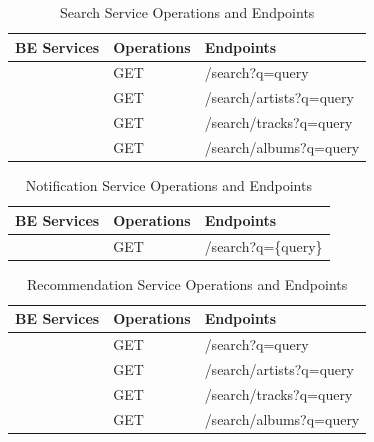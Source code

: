 \documentclass[a4paper,12pt]{article}
\begin{document}
\begin{table}[H]
    \centering
    \renewcommand{\arraystretch}{1.2}
    \begin{tabular}{|>{\centering\arraybackslash}m{5.5cm}|m{2.5cm}|m{6.0cm}|}
    \hline
    \textbf{BE Services} & \textbf{Operations} & \textbf{Endpoints} \\
    \hline
    \multirow{4}{*}{\textbf{Search Service}} 
    & GET & /search?q={query} \\
    & GET & /search/artists?q={query} \\
    & GET & /search/tracks?q={query} \\
    & GET & /search/albums?q={query} \\
    \hline
    \end{tabular}
    \caption{Search Service Operations and Endpoints}
\end{table}

\begin{table}[H]
    \centering
    \renewcommand{\arraystretch}{1.2}
    \begin{tabular}{|>{\centering\arraybackslash}m{5.5cm}|m{2.5cm}|m{6.0cm}|}
    \hline
    \textbf{BE Services} & \textbf{Operations} & \textbf{Endpoints} \\
    \hline
    \multirow{1}{*}{\textbf{Notification Service}} 
    & GET & /search?q=\{query\} \\
    \hline
    \end{tabular}
    \caption{Notification Service Operations and Endpoints}
\end{table}

\begin{table}[H]
    \centering
    \renewcommand{\arraystretch}{1.2}
    \begin{tabular}{|>{\centering\arraybackslash}m{5.5cm}|m{2.5cm}|m{6.0cm}|}
    \hline
    \textbf{BE Services} & \textbf{Operations} & \textbf{Endpoints} \\
    \hline
    \multirow{4}{*}{\textbf{Recommendation Service}} 
    & GET & /search?q={query} \\
    & GET & /search/artists?q={query} \\
    & GET & /search/tracks?q={query} \\
    & GET & /search/albums?q={query} \\
    \hline
    \end{tabular}
    \caption{Recommendation Service Operations and Endpoints}
\end{table}
\end{document}
